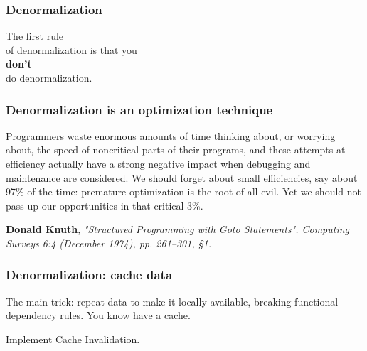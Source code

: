 \documentclass[xcolor=dvipsnames]{beamer}
\begin{document}
\begin{frame}[fragile]
  \frametitle{Denormalization}

  \begin{center}
    {\Huge The first rule \\
    of denormalization is that you \\
    \textbf{don't} \\
    do denormalization.
    }
  \end{center} 
\end{frame}

\begin{frame}[fragile]
  \frametitle{Denormalization is an optimization technique}
  
  \begin{displayquote}
    Programmers waste enormous amounts of time thinking about, or worrying
    about, the speed of noncritical parts of their programs, and these
    attempts at efficiency actually have a strong negative impact when
    debugging and maintenance are considered. We should forget about small
    efficiencies, say about 97\% of the time: {\Huge premature optimization
      is the root of all evil.} Yet we should not pass up our opportunities
    in that critical 3\%.
  \end{displayquote}

  \textbf{Donald Knuth}, \textit{"Structured Programming with Goto
    Statements". Computing Surveys 6:4 (December 1974), pp. 261–301, §1.}
\end{frame}

\begin{frame}[fragile]
  \frametitle{Denormalization: cache data}

  The main trick: repeat data to make it locally available, breaking
  functional dependency rules. You know have a cache.
  \vfill

  \begin{center}
    Implement {\LARGE Cache Invalidation}.
  \end{center}
\end{frame}

\end{document}
